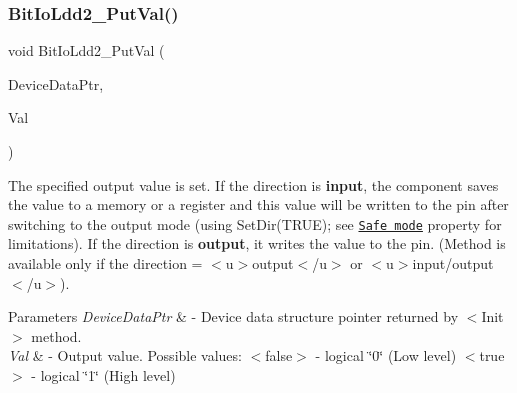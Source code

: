 \subsubsection{\texorpdfstring{Bit\+Io\+Ldd2\+\_\+\+Put\+Val()}{BitIoLdd2\_PutVal()}}
{\footnotesize\ttfamily void Bit\+Io\+Ldd2\+\_\+\+Put\+Val (\begin{DoxyParamCaption}\item[{\hyperlink{group___p_e___types__module_gac5cf1362f1f0e3a2ce71b1bf2276d091}{L\+D\+D\+\_\+\+T\+Device\+Data} $\ast$}]{Device\+Data\+Ptr,  }\item[{bool}]{Val }\end{DoxyParamCaption})}



The specified output value is set. If the direction is {\bfseries  input}, the component saves the value to a memory or a register and this value will be written to the pin after switching to the output mode (using {\ttfamily Set\+Dir(\+T\+R\+U\+E)}; see \href{BitIOProperties.html#SafeMode}{\tt Safe mode} property for limitations). If the direction is {\bfseries output}, it writes the value to the pin. (Method is available only if the direction = $<$u$>${\ttfamily output}$<$/u$>$ or $<$u$>${\ttfamily  input/output}$<$/u$>$). 


\begin{DoxyParams}{Parameters}
{\em Device\+Data\+Ptr} & -\/ Device data structure pointer returned by $<$\+Init$>$ method. \\
\hline
{\em Val} & -\/ Output value. Possible values\+: $<$false$>$ -\/ logical \char`\"{}0\char`\"{} (Low level) $<$true$>$ -\/ logical \char`\"{}1\char`\"{} (High level) \\
\hline
\end{DoxyParams}
